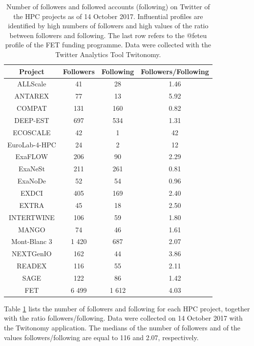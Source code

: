 \begin{table}[t]
 \begin{center}
 {\scriptsize
  \begin{tabular}{cccc}
   \hline 
   \hline
   Project & Followers & Following & Followers/Following \\ 
   \hline
   \hline
   ALLScale & 41 & 28 & 1.46 \\
   ANTAREX & 77 & 13 & 5.92 \\
   COMPAT & 131 & 160 & 0.82 \\
   DEEP-EST & 697 & 534 & 1.31 \\
   ECOSCALE & 42 & 1 & 42 \\
   EuroLab-4-HPC & 24 & 2 & 12 \\
   ExaFLOW & 206 & 90 & 2.29 \\
   ExaNeSt & 211 & 261 & 0.81  \\
   ExaNoDe & 52 & 54 & 0.96 \\
   EXDCI & 405 & 169 & 2.40 \\
   EXTRA & 45 & 18 & 2.50\\
   INTERTWINE & 106 & 59 & 1.80 \\
   MANGO & 74 & 46 & 1.61 \\
   Mont-Blanc 3 & 1 420 & 687 & 2.07 \\
   NEXTGenIO & 162 & 44 & 3.86 \\
   READEX & 116 & 55 & 2.11 \\
   SAGE & 122 & 86 & 1.42 \\ 
   FET & 6 499 & 1 612 & 4.03 \\
   \hline
   \hline
  \end{tabular}
 } 
 \end{center} 
 \caption{Number of followers and followed accounts (following) on Twitter of the HPC projects as of 14 October 2017. Influential profiles are identified by high numbers of followers and high values of the ratio between followers and following. The last row refers to the @fet\textunderscore eu profile of the FET funding programme. Data were collected with the Twitter Analytics Tool Twitonomy.}
\label{HPC_influence_table} 
\end{table}

Table \ref{HPC_influence_table} lists the number of followers and following for each HPC project, together with the ratio followers/following. Data were collected on 14 October 2017 with the Twitonomy application. The medians of the number of followers and of the values followers/following are equal to 116 and 2.07, respectively. 

